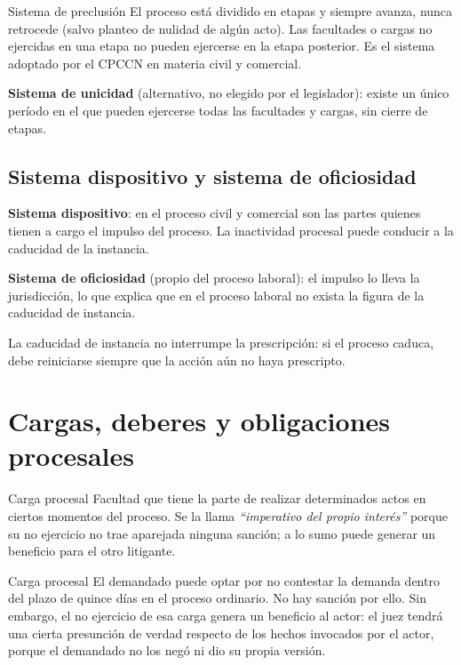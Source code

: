 \documentclass[12pt,oneside]{book}
\begin{document}
\begin{definition}{Sistema de preclusión}
El proceso está dividido en etapas y siempre avanza, nunca retrocede (salvo planteo de nulidad de algún acto). Las facultades o cargas no ejercidas en una etapa no pueden ejercerse en la etapa posterior. Es el sistema adoptado por el CPCCN en materia civil y comercial.
\end{definition}

\textbf{Sistema de unicidad} (alternativo, no elegido por el legislador): existe un único período en el que pueden ejercerse todas las facultades y cargas, sin cierre de etapas.

\subsection{Sistema dispositivo y sistema de oficiosidad}

\textbf{Sistema dispositivo}: en el proceso civil y comercial son las partes quienes tienen a cargo el impulso del proceso. La inactividad procesal puede conducir a la caducidad de la instancia.

\textbf{Sistema de oficiosidad} (propio del proceso laboral): el impulso lo lleva la jurisdicción, lo que explica que en el proceso laboral no exista la figura de la caducidad de instancia.

\begin{note}
La caducidad de instancia no interrumpe la prescripción: si el proceso caduca, debe reiniciarse siempre que la acción aún no haya prescripto.
\end{note}

\section{Cargas, deberes y obligaciones procesales}

\begin{definition}{Carga procesal}
Facultad que tiene la parte de realizar determinados actos en ciertos momentos del proceso. Se la llama \textit{``imperativo del propio interés''} porque su no ejercicio no trae aparejada ninguna sanción; a lo sumo puede generar un beneficio para el otro litigante.
\end{definition}

\begin{example}{Carga procesal}
El demandado puede optar por no contestar la demanda dentro del plazo de quince días en el proceso ordinario. No hay sanción por ello. Sin embargo, el no ejercicio de esa carga genera un beneficio al actor: el juez tendrá una cierta presunción de verdad respecto de los hechos invocados por el actor, porque el demandado no los negó ni dio su propia versión.
\end{example}
\end{document}
